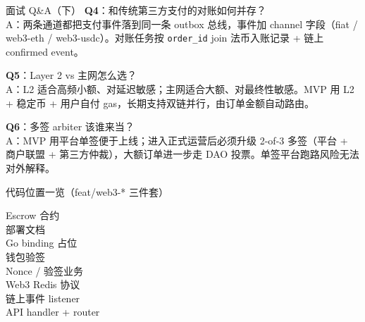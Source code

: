 \begin{frame}{面试 Q\&A（下）}
\textbf{Q4}：和传统第三方支付的对账如何并存？\\
\hspace{4mm}\small A：两条通道都把支付事件落到同一条 outbox 总线，事件加 channel 字段（fiat / web3-eth / web3-usdc）。对账任务按 \texttt{order\_id} join 法币入账记录 + 链上 confirmed event。

\vspace{2mm}
\textbf{Q5}：Layer 2 vs 主网怎么选？\\
\hspace{4mm}\small A：L2 适合高频小额、对延迟敏感；主网适合大额、对最终性敏感。MVP 用 L2 + 稳定币 + 用户自付 gas，长期支持双链并行，由订单金额自动路由。

\vspace{2mm}
\textbf{Q6}：多签 arbiter 该谁来当？\\
\hspace{4mm}\small A：MVP 用平台单签便于上线；进入正式运营后必须升级 2-of-3 多签（平台 + 商户联盟 + 第三方仲裁），大额订单进一步走 DAO 投票。单签平台跑路风险无法对外解释。
\end{frame}

\begin{frame}{代码位置一览（feat/web3-* 三件套）}
\small
\begin{description}
  \item[Escrow 合约]
  \item[部署文档]
  \item[Go binding 占位]
  \item[钱包验签]
  \item[Nonce / 验签业务]
  \item[Web3 Redis 协议]
  \item[链上事件 listener]
  \item[API handler + router]
\end{description}
\end{frame}


